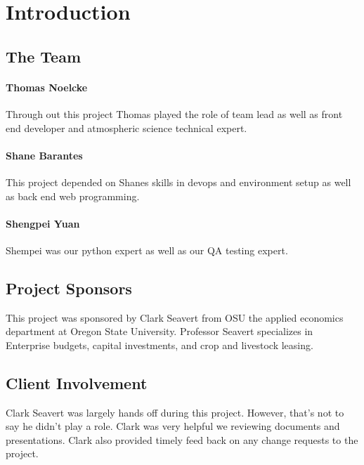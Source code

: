 \documentclass[onecolumn, draftclsnofoot,10pt, compsoc]{article}
\begin{document}
\newpage
{}
\tableofcontents
\newpage
\clearpage

\section{Introduction}

		\subsection{The Team}
		    \paragraph{Thomas Noelcke} Through out this project Thomas played the role of team lead as well as front end developer and atmospheric science technical expert.\\

		    \paragraph{Shane Barantes} This project depended on Shanes skills in devops and environment setup as well as back end web programming.\\

		    \paragraph{Shengpei Yuan} Shempei was our python expert as well as our QA testing expert.\\

		\subsection{Project Sponsors}
		    This project was sponsored by Clark Seavert from OSU the applied economics department at Oregon State University. Professor Seavert specializes in Enterprise budgets, capital investments, and crop and livestock leasing.\\

        \subsection{Client Involvement}
            Clark Seavert was largely hands off during this project. However, that's not to say he didn't play a role. Clark was very helpful we reviewing documents and presentations. Clark also provided timely feed back on any change requests to the project.\\
\end{document}

